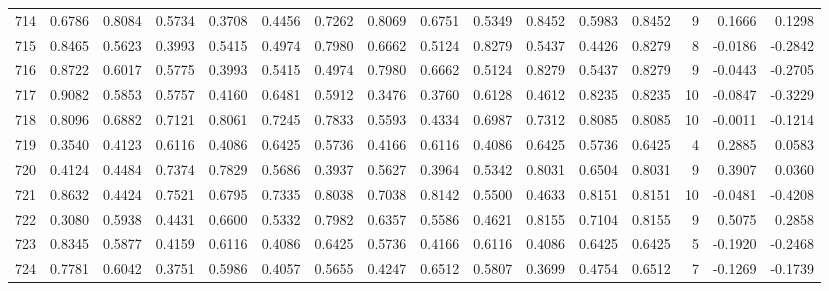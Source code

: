 \begin{tabular}{lrrrrrrrrrrrrrrr}
714 &      0.6786 &  0.8084 &  0.5734 &  0.3708 &  0.4456 &  0.7262 &  0.8069 &  0.6751 &  0.5349 &  0.8452 &   0.5983 &     0.8452 &      9 &                    0.1666 &                     0.1298 \\
715 &      0.8465 &  0.5623 &  0.3993 &  0.5415 &  0.4974 &  0.7980 &  0.6662 &  0.5124 &  0.8279 &  0.5437 &   0.4426 &     0.8279 &      8 &                   -0.0186 &                    -0.2842 \\
716 &      0.8722 &  0.6017 &  0.5775 &  0.3993 &  0.5415 &  0.4974 &  0.7980 &  0.6662 &  0.5124 &  0.8279 &   0.5437 &     0.8279 &      9 &                   -0.0443 &                    -0.2705 \\
717 &      0.9082 &  0.5853 &  0.5757 &  0.4160 &  0.6481 &  0.5912 &  0.3476 &  0.3760 &  0.6128 &  0.4612 &   0.8235 &     0.8235 &     10 &                   -0.0847 &                    -0.3229 \\
718 &      0.8096 &  0.6882 &  0.7121 &  0.8061 &  0.7245 &  0.7833 &  0.5593 &  0.4334 &  0.6987 &  0.7312 &   0.8085 &     0.8085 &     10 &                   -0.0011 &                    -0.1214 \\
719 &      0.3540 &  0.4123 &  0.6116 &  0.4086 &  0.6425 &  0.5736 &  0.4166 &  0.6116 &  0.4086 &  0.6425 &   0.5736 &     0.6425 &      4 &                    0.2885 &                     0.0583 \\
720 &      0.4124 &  0.4484 &  0.7374 &  0.7829 &  0.5686 &  0.3937 &  0.5627 &  0.3964 &  0.5342 &  0.8031 &   0.6504 &     0.8031 &      9 &                    0.3907 &                     0.0360 \\
721 &      0.8632 &  0.4424 &  0.7521 &  0.6795 &  0.7335 &  0.8038 &  0.7038 &  0.8142 &  0.5500 &  0.4633 &   0.8151 &     0.8151 &     10 &                   -0.0481 &                    -0.4208 \\
722 &      0.3080 &  0.5938 &  0.4431 &  0.6600 &  0.5332 &  0.7982 &  0.6357 &  0.5586 &  0.4621 &  0.8155 &   0.7104 &     0.8155 &      9 &                    0.5075 &                     0.2858 \\
723 &      0.8345 &  0.5877 &  0.4159 &  0.6116 &  0.4086 &  0.6425 &  0.5736 &  0.4166 &  0.6116 &  0.4086 &   0.6425 &     0.6425 &      5 &                   -0.1920 &                    -0.2468 \\
724 &      0.7781 &  0.6042 &  0.3751 &  0.5986 &  0.4057 &  0.5655 &  0.4247 &  0.6512 &  0.5807 &  0.3699 &   0.4754 &     0.6512 &      7 &                   -0.1269 &                    -0.1739 \\

\end{tabular}
